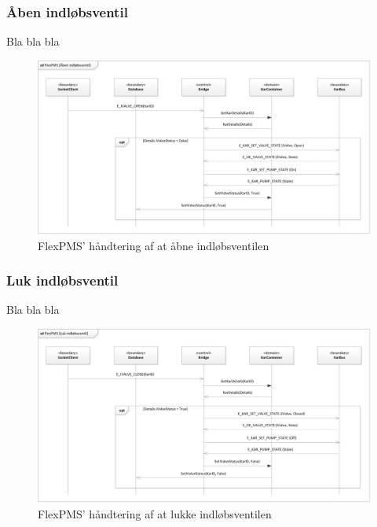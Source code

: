 \subsubsection{Åben indløbsventil}

Bla bla bla

\begin{figure}[H]
	\centering
	\includegraphics[scale=.6]{SoftwareArkitektur/FlexPMS/Diagrammer/Case_OpenIValve.png}
	\caption{FlexPMS' håndtering af at åbne indløbsventilen}
	\label{photo:OpenOValveUseCase}
\end{figure}


\subsubsection{Luk indløbsventil}

Bla bla bla

\begin{figure}[H]
	\centering
	\includegraphics[scale=.6]{SoftwareArkitektur/FlexPMS/Diagrammer/Case_CloseIValve.png}
	\caption{FlexPMS' håndtering af at lukke indløbsventilen}
	\label{photo:CloseOValveUseCase}
\end{figure}

